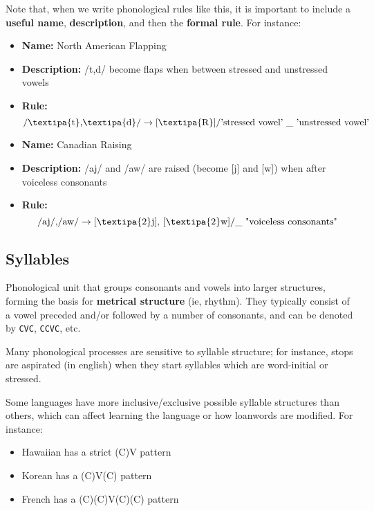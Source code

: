 \documentclass[12pt]{article}
\begin{document}
Note that, when we write phonological rules like this, it is important to include a \textbf{useful name}, \textbf{description}, and then the \textbf{formal rule}. For instance:
\begin{itemize}
  \item \textbf{Name:} North American Flapping
  \item \textbf{Description:} /t,d/ become flaps when between stressed and unstressed vowels
  \item \textbf{Rule:}\[\text{/\textipa{t},\textipa{d}/}\rightarrow \text{[\textipa{R}]}/\text{'stressed vowel' \_ 'unstressed vowel'}\]
\end{itemize}
\begin{itemize}
  \item \textbf{Name:} Canadian Raising
  \item \textbf{Description:} /aj/ and /aw/ are raised (become [j] and [w]) when after voiceless consonants
  \item \textbf{Rule:}\[\text{/aj/,/aw/}\rightarrow\text{[\textipa{2}j], [\textipa{2}w]} / \text{\_ "voiceless consonants"}\]
\end{itemize}

\subsection{Syllables}
\begin{definitionEnd}[Syllable]
  Phonological unit that groups consonants and vowels into larger structures, forming the basis for \textbf{metrical structure} (ie, rhythm). They typically consist of a vowel preceded and/or followed by a number of consonants, and can be denoted by \texttt{CVC}, \texttt{CCVC}, etc.
\end{definitionEnd}

Many phonological processes are sensitive to syllable structure; for instance, stops are aspirated (in english) when they start syllables which are word-initial or stressed.

Some languages have more inclusive/exclusive possible syllable structures than others, which can affect learning the language or how loanwords are modified. For instance:
\begin{itemize}
  \item Hawaiian has a strict (C)V pattern
  \item Korean has a (C)V(C) pattern
  \item French has a (C)(C)V(C)(C) pattern
\end{itemize}
\end{document}
